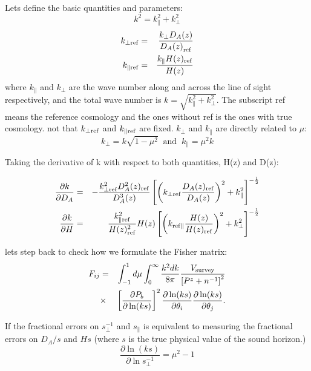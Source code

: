 \documentclass[10pt,a4paper]{article}
\begin{document}
Lets define the basic quantities and parameters:
\begin{equation}
k ^2 = k_\parallel^2 + k_\perp^2
\end{equation}\label{eq:k}
\begin{eqnarray}
k_{\perp {\rm ref}} &=& \frac{k_{\perp} D_A (z) }{{D_A(z)}_{\rm ref}}   \\\nonumber
k_{\parallel {\rm ref} } &=& \frac{k_{\parallel} H(z)_{\rm ref}}{{H(z)}}
\end{eqnarray}\label{eq:perp_para}
where $k_{\parallel}$ and $k_{\perp}$ are the wave number along and across  the line of sight respectively,
and the total wave number is $k = \sqrt{k_\parallel^2 + k_\perp^2}$. The subscript ref means the reference cosmology and the ones without ref is the ones with true cosmology. not that $k_{\perp{\rm ref}}$ and $k_{\parallel {\rm ref}}$ are fixed.
$k_{\perp}$ and $k_{\parallel}$ are directly related to $\mu$:
\begin{equation}
k_{\perp}= k \sqrt{1 - \mu^2}  \;  \;\mbox{and} \;  \; k_{\parallel} = \mu^2 k
\end{equation}


Taking the derivative of k with respect to both quantities, H(z) and D(z):

\begin{eqnarray}
\frac{\partial k}{\partial D_A} &=& - \frac{ k_{\perp {\rm ref}}^2 D_A^2(z)_{\rm ref}}{D_A^3(z)}    \left[  \left(  k_{\perp {\rm ref} } \frac{D_A(z)_{\rm ref}}{D_A(z)}\right)^2 + k^2_{\parallel} \right]^{-\frac{1}{2}} \\\nonumber
\frac{\partial k}{\partial H} &=&    \frac{k_{\parallel {\rm ref}}^2}{H(z)_{\rm ref}^2} H(z)  \left[  \left(  k_{{\rm ref} \parallel} \frac{H(z)}{H(z)_{\rm ref}}\right)^2 + k^2_{\perp} \right]^{-\frac{1}{2}}
\end{eqnarray}\label{eq:dkdlogDa_H}

lets step back to check how we  formulate  the Fisher matrix:
\begin{eqnarray}\label{FIJ_DEV}
F_{ij}&=&\int_{-1}^{1}d\mu\int_{0}^{\infty}\frac{k^2dk}{8\pi} \frac{V_{\rm survey}}{\left[P^z+n^{-1}\right]^2}\nonumber \\
& \times & \left[\frac{\partial P_{b}}{\partial \ln (ks)} \right ]^2 
 \frac{\partial \ln (ks)}{\partial \theta_i}\frac{\partial \ln (ks)}{\partial \theta_j} .
\end{eqnarray}

If the fractional errors on $s_\perp^{-1}$ and  $s_\parallel$ is equivalent to measuring the fractional errors on $D_A/s$ and $Hs$ (where $s$ is the true physical value of the sound horizon.) 
\begin{equation}
 \frac{\partial \ln (ks)}{\partial \ln{s_\perp^{-1}}} = \mu^2 - 1
\end{equation}
\end{document}
